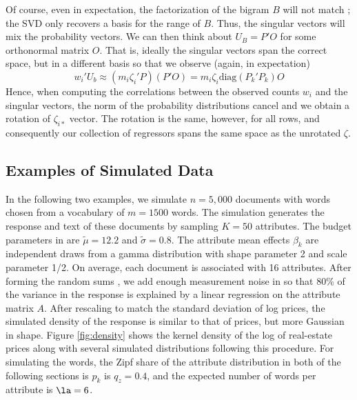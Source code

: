 \documentclass[12pt]{article}
\begin{document}
 
 Of course, even in expectation, the factorization of the bigram $B$ will not
 match  ; the SVD  only recovers a basis for the range of $B$.  Thus, the 
 singular vectors will mix the probability vectors.  We can
 then think about $U_B = P'O$ for some orthonormal matrix $O$.  That is, ideally
 the singular vectors span the correct space, but in a different basis so that
 we observe (again, in expectation)
 \begin{displaymath}
   w_i'U_b \approx (m_i \zeta_i'P)(P'O) = m_i \zeta_i \mbox{diag}(P_k'P_k) O
 \end{displaymath}
 Hence, when computing the correlations between the observed counts $w_i$ and the
 singular vectors, the norm of the probability distributions cancel and we
 obtain a rotation of  $\zeta_{i*}$ vector.  The rotation is the same, however,
 for all rows, and consequently our collection of regressors spans the same
 space as the unrotated $\zeta$.



\subsection{Examples of Simulated Data}

In the following two examples, we simulate $n = 5,000$ documents with words chosen from a vocabulary of $m = 1500$ words.  The simulation generates the response and text of these documents by sampling $K = 50$ attributes.  The budget parameters in  are $\tilde\mu = 12.2$ and $\tilde\sigma = 0.8$.  The attribute mean effects $\beta_k$ are independent draws from a gamma distribution with shape parameter 2 and scale parameter 1/2.  On average, each document is associated with 16 attributes. After forming  the random sums , we add enough measurement noise in  so that 80\% of the variance in the response is explained by a linear regression on the attribute matrix $A$.  After rescaling to match the standard deviation of log prices, the simulated density of the response is similar to that of prices, but more Gaussian in shape.  Figure \ref{fig:density} shows the kernel density of the log of real-estate prices along with several simulated distributions following this procedure.  For simulating the words, the Zipf share of the attribute distribution in both of the following sections is $p_k$ is $q_z = 0.4$, and the expected number of words per attribute is $\la = 6$.  
\end{document}
